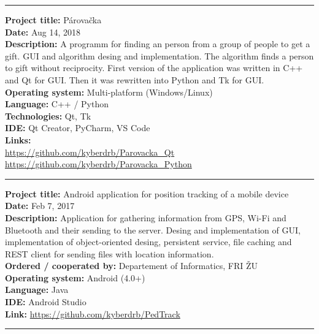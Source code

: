 \documentclass[slovak]{article}
\begin{document}
\begin{center}\rule{3in}{0.4pt}\end{center}

\noindent
\textbf{Project title:} Párovačka\\
\textbf{Date:} Aug 14, 2018\\
\textbf{Description:} A programm for finding an person from a
group of people to get a gift. GUI and algorithm desing and
implementation. The algorithm finds a person to gift without
reciprocity. First version of the application was written in C++ and Qt
for GUI. Then it was rewritten into Python and Tk for
GUI.\\
\textbf{Operating system:} Multi-platform (Windows/Linux)\\
\textbf{Language:} C++ / Python\\
\textbf{Technologies:} Qt, Tk\\
\textbf{IDE:} Qt Creator, PyCharm, VS
Code\\
\textbf{Links:}\\
\href{https://github.com/kyberdrb/Parovacka\_Qt}{https://github.com/kyberdrb/Parovacka\_Qt}\\
\href{https://github.com/kyberdrb/Parovacka\_Python}{https://github.com/kyberdrb/Parovacka\_Python}

\begin{center}\rule{3in}{0.4pt}\end{center}

\noindent
\textbf{Project title:} Android application for position tracking of a mobile device\\
\textbf{Date:} Feb 7, 2017\\
\textbf{Description:} Application for gathering information from GPS, Wi-Fi and Bluetooth and
their sending to the server. Desing and implementation of GUI,
implementation of object-oriented desing, persistent service, file
caching and REST client for sending files with location
information.\\
\textbf{Ordered / cooperated by:} Departement of Informatics, FRI ŽU\\
\textbf{Operating system:} Android (4.0+)\\
\textbf{Language:} Java\\
\textbf{IDE:} Android Studio\\
\textbf{Link:} \href{https://github.com/kyberdrb/PedTrack}{https://github.com/kyberdrb/PedTrack}

\begin{center}\rule{3in}{0.4pt}\end{center}
\end{document}
